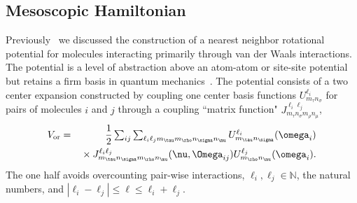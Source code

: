 \documentclass[preprint]{iucr}              %
\newcommand{\mb}[1]{\ensuremath{\mbox{\boldmath $ #1 $}}}
\begin{document}
\subsection{Mesoscopic Hamiltonian}
\label{hamiltonian}

Previously~\cite{Mettes04} we discussed the construction of a
nearest neighbor rotational potential for molecules interacting primarily through van der Waals interactions.
The potential is a level of abstraction above an atom-atom or site-site
potential but retains a firm basis in quantum
mechanics~\cite{Avoird94}. The potential consists of a two center
expansion constructed by coupling one center basis functions
$U^{\ell_i}_{m_\tau n_\sigma}$ 
for pairs of molecules $i$ and $j$ through a coupling ``matrix function" 
$J_{m_\tau n_\sigma m_\rho n_\mu}^{\ell_i\ell_j}$,
\begin{eqnarray}
\label{re:eq:vij2}V_{\mathrm{or}} &=&
\frac{1}{2}\sum_{ij}\sum_{\ell_i\ell_j m_\tau m_\rho n_\sigma n_\mu}
U^{\ell_i}_{m_\tau n_\sigma}(\mb{\omega}_i)\nonumber\\
&&{}\times J_{m_\tau n_\sigma m_\rho n_\mu}^{\ell_i
\ell_j}(\mb{\nu},\mb{\Omega}_{ij})U^{\ell_j}_{m_\rho
n_\mu}(\mb{\omega}_i).
\end{eqnarray}
The one half avoids overcounting pair-wise interactions, $\ell_i,\ell_j\in\mathbb{N}$, the
natural numbers, and $|\ell_i-\ell_j|\leq\ell\leq \ell_i+\ell_j$.
\end{document}
